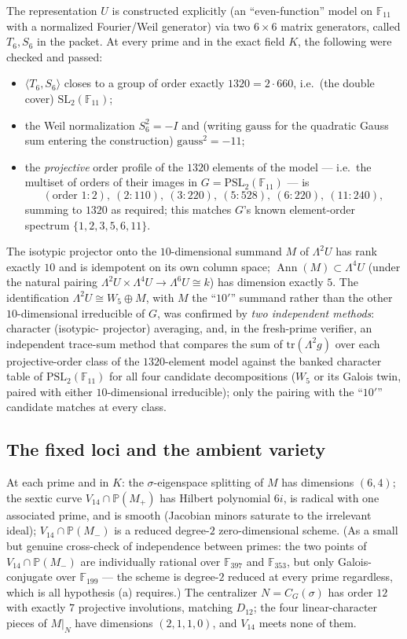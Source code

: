 \documentclass[11pt]{article}
\theoremstyle{plain}
\theoremstyle{definition}
\theoremstyle{remark}
\newcommand{\PSL}{\mathrm{PSL}_2(\mathbb{F}_{11})}
\newcommand{\SLg}{\mathrm{SL}_2(\mathbb{F}_{11})}
\DeclareMathOperator{\Ann}{Ann}
\newcommand{\PP}{\mathbb P}
\begin{document}
The representation $U$ is constructed explicitly (an ``even-function''
model on $\mathbb F_{11}$ with a normalized Fourier/Weil generator) via
two $6\times6$ matrix generators, called $T_6,S_6$ in the packet. At
every prime and in the exact field $K$, the following were checked and
passed:
\begin{itemize}
\item $\langle T_6,S_6\rangle$ closes to a group of order exactly
$1320=2\cdot 660$, i.e.\ (the double cover) $\SLg$;
\item the Weil normalization $S_6^2=-I$ and (writing $\mathrm{gauss}$
for the quadratic Gauss sum entering the construction) $\mathrm{gauss}
^2=-11$;
\item the \emph{projective} order profile of the $1320$ elements of the
model --- i.e.\ the multiset of orders of their images in
$G=\PSL$ --- is
\[
(\text{order }1: 2),\ (2: 110),\ (3: 220),\ (5: 528),\ (6: 220),\ (11:
240),
\]
summing to $1320$ as required; this matches $G$'s known element-order
spectrum $\{1,2,3,5,6,11\}$.
\end{itemize}
The isotypic projector onto the $10$-dimensional summand $M$ of
$\Lambda^2U$ has rank exactly $10$ and is idempotent on its own column
space; $\Ann(M)\subset\Lambda^4U$ (under the natural pairing $\Lambda^2U
\times\Lambda^4U\to\Lambda^6U\cong k$) has dimension exactly $5$. The
identification $\Lambda^2U\cong W_5\oplus M$, with $M$ the ``$10'$''
summand rather than the other $10$-dimensional irreducible of $G$, was
confirmed by \emph{two independent methods}: character (isotypic-
projector) averaging, and, in the fresh-prime verifier, an independent
trace-sum method that compares the sum of $\mathrm{tr}(\Lambda^2g)$
over each projective-order class of the $1320$-element model against
the banked character table of $\PSL$ for all four candidate
decompositions ($W_5$ or its Galois twin, paired with either
$10$-dimensional irreducible); only the pairing with the ``$10'$''
candidate matches at every class.

\subsection{The fixed loci and the ambient variety}

At each prime and in $K$: the $\sigma$-eigenspace splitting of $M$ has
dimensions $(6,4)$; the sextic curve $V_{14}\cap\PP(M_+)$ has Hilbert
polynomial $6i$, is radical with one associated prime, and is smooth
(Jacobian minors saturate to the irrelevant ideal); $V_{14}\cap\PP(M_-)$
is a reduced degree-$2$ zero-dimensional scheme. (As a small but
genuine cross-check of independence between primes: the two points of
$V_{14}\cap\PP(M_-)$ are individually rational over $\mathbb F_{397}$
and $\mathbb F_{353}$, but only Galois-conjugate over $\mathbb F_{199}$
--- the scheme is degree-$2$ reduced at every prime regardless, which is
all hypothesis (a) requires.) The centralizer $N=C_G(\sigma)$ has order
$12$ with exactly $7$ projective involutions, matching $D_{12}$; the
four linear-character pieces of $M|_N$ have dimensions $(2,1,1,0)$, and
$V_{14}$ meets none of them.
\end{document}
